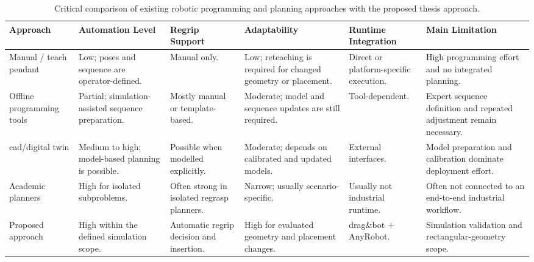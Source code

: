 ﻿\begin{landscape}
\begin{table}[p]
\centering
\small
\setlength{\tabcolsep}{5pt}
\renewcommand{\arraystretch}{1.25}

\begin{tabularx}{\linewidth}{
L{3.0cm}
L{3.1cm}
L{2.8cm}
L{3.1cm}
L{3.1cm}
Y
}
\hline
\textbf{Approach} &
\textbf{Automation Level} &
\textbf{Regrip Support} &
\textbf{Adaptability} &
\textbf{Runtime Integration} &
\textbf{Main Limitation} \\
\hline

Manual / teach pendant &
Low; poses and sequence are operator-defined. &
Manual only. &
Low; reteaching is required for changed geometry or placement. &
Direct or platform-specific execution. &
High programming effort and no integrated planning. \\
\hline

Offline programming tools &
Partial; simulation-assisted sequence preparation. &
Mostly manual or template-based. &
Moderate; model and sequence updates are still required. &
Tool-dependent. &
Expert sequence definition and repeated adjustment remain necessary. \\
\hline

\acs{cad}/digital twin &
Medium to high; model-based planning is possible. &
Possible when modelled explicitly. &
Moderate; depends on calibrated and updated models. &
External interfaces. &
Model preparation and calibration dominate deployment effort. \\
\hline

Academic planners &
High for isolated subproblems. &
Often strong in isolated regrasp planners. &
Narrow; usually scenario-specific. &
Usually not industrial runtime. &
Often not connected to an end-to-end industrial workflow. \\
\hline

Proposed approach &
High within the defined simulation scope. &
Automatic regrip decision and insertion. &
High for evaluated geometry and placement changes. &
drag\&bot + AnyRobot. &
Simulation validation and rectangular-geometry scope. \\
\hline

\end{tabularx}

\caption{Critical comparison of existing robotic programming and planning approaches with the proposed thesis approach.}
\label{tab:critical-comparison-existing-approaches}
\end{table}
\end{landscape}

\FloatBarrier
